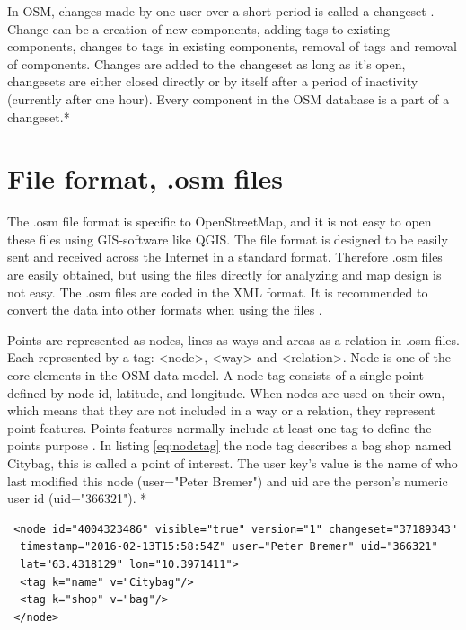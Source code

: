 In OSM, changes made by one user over a short period is called a changeset \cite{OpenStreetMapi}.  Change can be a creation of new components, adding tags to existing components, changes to tags in existing components, removal of tags and removal of components. Changes are added to the changeset as long as it's open, changesets are either closed directly or by itself after a period of inactivity (currently after one hour). Every component in the OSM database is a part of a changeset.* %

 \section{File format, .osm files}\label{sec:osmxml}
The .osm file format is specific to OpenStreetMap, and it is not easy to open these files using GIS-software like QGIS. The file format is designed to be easily sent and received across the Internet in a standard format. Therefore .osm files are easily obtained, but using the files directly for analyzing and map design is not easy. The .osm files are coded in the XML format. It is recommended to convert the data into other formats when using the files \cite{Learnosm}. 

Points are represented as nodes, lines as ways and areas as a relation in .osm files. Each represented by a tag: <node>, <way> and <relation>. Node is one of the core elements in the OSM data model. A node-tag consists of a single point defined by node-id, latitude, and longitude. When nodes are used on their own, which means that they are not included in a way or a relation, they represent point features. Points features normally include at least one tag to define the points purpose \cite{OpenStreetMapc}. In listing \ref{eq:nodetag} the node tag describes a bag shop named Citybag, this is called a point of interest. The user key's value is the name of who last modified this node (user="Peter Bremer") and uid are the person's numeric user id (uid="366321"). * %

\begin{lstlisting}
 <node id="4004323486" visible="true" version="1" changeset="37189343"
  timestamp="2016-02-13T15:58:54Z" user="Peter Bremer" uid="366321" 
  lat="63.4318129" lon="10.3971411">
  <tag k="name" v="Citybag"/>
  <tag k="shop" v="bag"/>
 </node>
\end{lstlisting}

